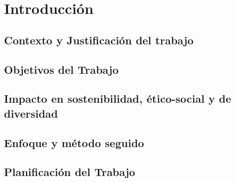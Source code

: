 \documentclass[12pt,a4paper]{article}
\begin{document}




\section{Introducción}                                                   %
\subsection{Contexto y Justificación del trabajo}                        %
\subsection{Objetivos del Trabajo}                                       %
\subsection{Impacto en sostenibilidad, ético-social y de diversidad}     %
\subsection{Enfoque y método seguido}                                    %
\subsection{Planificación del Trabajo}                                   %
\end{document}
